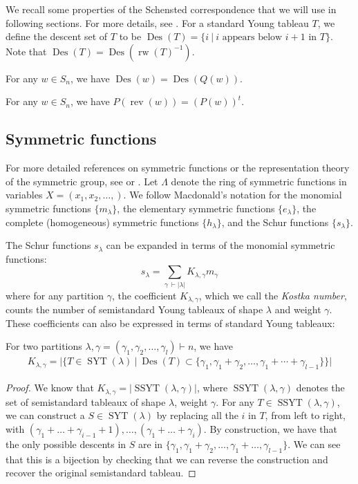 \documentclass[ALCO, Unicode]{cedram}
\DeclareMathOperator{\syt}{SYT}
\DeclareMathOperator{\ssyt}{SSYT}
\DeclareMathOperator{\rev}{rev}
\DeclareMathOperator{\des}{Des}
\DeclareMathOperator{\rw}{rw}
\begin{document}
We recall some properties of the Schensted correspondence that we will use in following sections. For more details, see \cite[Chapter 7]{EC2}. 
For a standard Young tableau $T$, we define the descent set of $T$ to be  $\des(T) = \{i  \ | \ i \text{ appears below } i+1 \text{ in } T\}.$
Note that $\des(T) = \des(\rw(T)^{-1})$.
\begin{prop}[{\cite[Lemma 7.23.11]{EC2}}]
    For any $w\in S_n$, we have $\des(w) = \des(Q(w))$. 
\end{prop}

\begin{prop}[{\cite[Corollary A1.2.11]{EC2}}]\label{thm:RSK rev}
For any $w\in S_n$, we have $P(\rev(w))= (P(w))^t.$
\end{prop}

\subsection{Symmetric functions}\label{subsec: symm functions}
For more detailed references on symmetric functions or the representation theory of the symmetric group, see \cite[Chapter 7]{EC2} or \cite{macdonald}.
Let $\Lambda$ denote the ring of symmetric functions in variables $X = (x_1,x_2,\dots, )$.
We follow Macdonald's notation \cite{macdonald} for the monomial symmetric functions $\{m_\lambda\}$, the elementary symmetric functions $\{e_\lambda\}$, the complete (homogeneous) symmetric functions $\{h_\lambda\}$, and the Schur functions $\{s_\lambda\}$.

The Schur functions $s_\lambda$ can be expanded in terms of the monomial symmetric functions:
\[s_\lambda  = \sum\limits_{\gamma \ \vdash |\lambda|} K_{\lambda,\gamma} m_{\gamma}\]
where for any partition $\gamma$, the coefficient $K_{\lambda,\gamma}$, which we call the \textit{Kostka number}, counts the number of semistandard Young tableaux of shape $\lambda$ and weight $\gamma$.
 These coefficients can also be expressed in terms of standard Young tableaux:

 \begin{prop}
     For two partitions $\lambda,\gamma = (\gamma_1,\gamma_2,\dots, \gamma_l)\vdash n$, we have
      \begin{align}\label{eq: kostka numb}
     K_{\lambda,\gamma} = | \{T\in \syt(\lambda)  \ | \ \des(T) \subset \{\gamma_1,\gamma_1 + \gamma_2, \dots, \gamma_1 +\cdots + \gamma_{l-1}\} \} |
 \end{align}
 \end{prop}
 \begin{proof}
     We know that $K_{\lambda,\gamma} = | \ssyt(\lambda,\gamma)|$, where $\ssyt(\lambda,\gamma)$ denotes the set of semistandard tableaux of shape $\lambda$, weight $\gamma$. For any $T\in \ssyt(\lambda,\gamma)$, we can construct a $S\in \syt(\lambda)$ by replacing all the $i$ in $T$, from left to right, with $(\gamma_1+\dots+\gamma_{i-1} +1),\dots,(\gamma_1+\dots+\gamma_{i})$. By construction, we have that the only possible descents in $S$ are in $\{\gamma_1,\gamma_1+\gamma_2,\dots, \gamma_1+\dots,\gamma_{l-1}\}$. We can see that this is a bijection by checking that we can reverse the construction and recover the original semistandard tableau.
 \end{proof}
\end{document}
